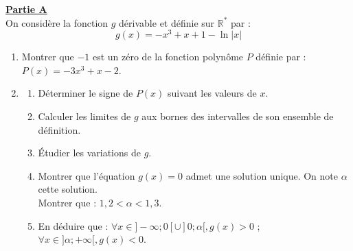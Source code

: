 \documentclass[12pt,a4paper]{article}
\begin{document}
\noindent \underline{\textbf{Partie A}} \\
On considère la fonction $g$ dérivable et définie sur $\mathbb{R}^*$ par :
\[ g(x) = -x^3 + x + 1 - \ln|x| \]
\begin{enumerate}
    \item Montrer que $-1$ est un zéro de la fonction polynôme $P$ définie par : $P(x) = -3x^3 + x - 2$.
    \item \begin{enumerate}
        \item Déterminer le signe de $P(x)$ suivant les valeurs de $x$.
        \item Calculer les limites de $g$ aux bornes des intervalles de son ensemble de définition.
        \item Étudier les variations de $g$.
        \item Montrer que l'équation $g(x) = 0$ admet une solution unique. On note $\alpha$ cette solution. \\
        Montrer que : $1,2 < \alpha < 1,3$.
        \item En déduire que : $\forall x \in ]-\infty; 0[ \cup ]0; \alpha[, g(x) > 0$ ; $\forall x \in ]\alpha; +\infty[, g(x) < 0$.
    \end{enumerate}
\end{enumerate}
\end{document}
